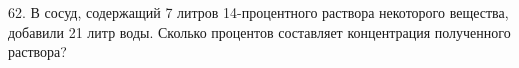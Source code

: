 62. В сосуд, содержащий 7 литров 14-процентного раствора некоторого вещества, добавили 21 литр воды. Сколько процентов составляет концентрация полученного раствора?\\
